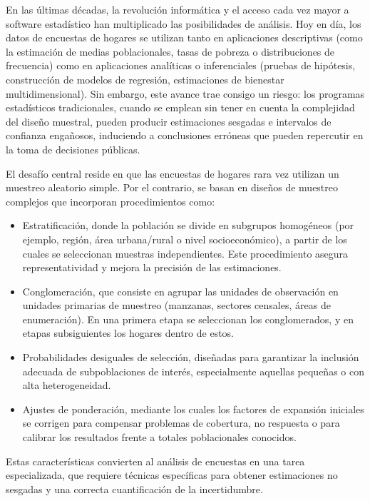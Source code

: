 \documentclass[
  12pt,
]{book}
\providecommand{\tightlist}{%
  \setlength{\itemsep}{0pt}\setlength{\parskip}{0pt}}
\begin{document}
En las últimas décadas, la revolución informática y el acceso cada vez mayor a software estadístico han multiplicado las posibilidades de análisis. Hoy en día, los datos de encuestas de hogares se utilizan tanto en aplicaciones descriptivas (como la estimación de medias poblacionales, tasas de pobreza o distribuciones de frecuencia) como en aplicaciones analíticas o inferenciales (pruebas de hipótesis, construcción de modelos de regresión, estimaciones de bienestar multidimensional). Sin embargo, este avance trae consigo un riesgo: los programas estadísticos tradicionales, cuando se emplean sin tener en cuenta la complejidad del diseño muestral, pueden producir estimaciones sesgadas e intervalos de confianza engañosos, induciendo a conclusiones erróneas que pueden repercutir en la toma de decisiones públicas.

El desafío central reside en que las encuestas de hogares rara vez utilizan un muestreo aleatorio simple. Por el contrario, se basan en diseños de muestreo complejos que incorporan procedimientos como:

\begin{itemize}
\tightlist
\item
  Estratificación, donde la población se divide en subgrupos homogéneos (por ejemplo, región, área urbana/rural o nivel socioeconómico), a partir de los cuales se seleccionan muestras independientes. Este procedimiento asegura representatividad y mejora la precisión de las estimaciones.
\item
  Conglomeración, que consiste en agrupar las unidades de observación en unidades primarias de muestreo (manzanas, sectores censales, áreas de enumeración). En una primera etapa se seleccionan los conglomerados, y en etapas subsiguientes los hogares dentro de estos.
\item
  Probabilidades desiguales de selección, diseñadas para garantizar la inclusión adecuada de subpoblaciones de interés, especialmente aquellas pequeñas o con alta heterogeneidad.
\item
  Ajustes de ponderación, mediante los cuales los factores de expansión iniciales se corrigen para compensar problemas de cobertura, no respuesta o para calibrar los resultados frente a totales poblacionales conocidos.
\end{itemize}

Estas características convierten al análisis de encuestas en una tarea especializada, que requiere técnicas específicas para obtener estimaciones no sesgadas y una correcta cuantificación de la incertidumbre.
\end{document}
